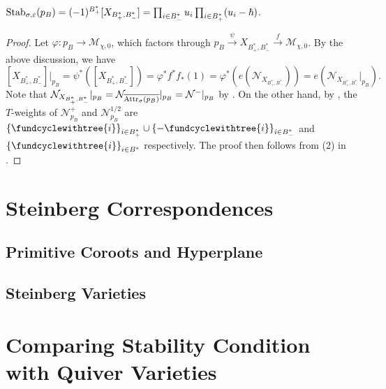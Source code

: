 \documentclass[b5paper]{article}
\newcommand{\NN}{\mathcal{N}}
\newcommand{\MM}{\mathcal{M}}
\newcommand{\Stab}{\textnormal{Stab}_{\sigma,\varepsilon}}
\newcommand{\Attr}{\textnormal{Attr}_\sigma}
\begin{document}
\begin{proposition}[pps:]{}
    $\Stab(p_B)=(-1)^{B^*_+}[X_{B^*_+,B^*_-}]=\prod_{i\in B^*_-}^{}u_i\prod_{i\in B^*_+}^{}(u_i-\hbar)$.
    \begin{proof}
        Let $\varphi:p_B\rightarrow \MM_{\chi,0}$, which factors through $p_B\xrightarrow[]{\psi}X_{B^*_+,B^*_-}\xrightarrow[]{f}\MM_{\chi,0}$. By the above discussion, we have
        \[
            [X_{B^*_+,B^*_-}]|_{p_B}=
        \psi^*([X_{B^*_+,B^*_-}])=\varphi^*f^*f_*(1)=\varphi^*(e(\mathcal{N}_{X_{B^*_+,B^*_-}}))=e(\mathcal{N}_{X_{B^*_+,B^*_-}}|_{p_B}).
        \]
        Note that $\mathcal{N}_{X_{B^*_+,B^*_-}}|_{p_B}=\mathcal{N}_{\overline{\Attr(p_B)}}|_{p_B}=\mathcal{N}^-|_{p_B}$ by .
        On the other hand,
        by , the $T$-weights of $\NN^+_{p_B}$ and $\NN^{1/2}_{p_B}$ are $\CB{\fundcyclewithtree{i}}_{i\in B^*_+}\cup \CB{-\fundcyclewithtree{i}}_{i\in B^*_-}$ and $\CB{\fundcyclewithtree{i}}_{i\in B^*}$ respectively.
        The proof then follows from (2) in .
    \end{proof}
\end{proposition}


\section{Steinberg Correspondences}
\subsection{Primitive Coroots and Hyperplane}
\subsection{Steinberg Varieties}

\section{Comparing Stability Condition with Quiver Varieties}
\label{sec:quiver_variety}
\appendix




\end{document}
